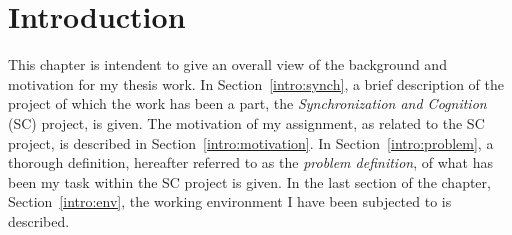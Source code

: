 
\cleardoublepage
\chapter{Introduction}
\label{intro}

This chapter is intendent to give an overall view of the background
and motivation for my thesis work.  In Section~\ref{intro:synch}, a
brief description of the project of which the work has been a part,
the {\em Synchronization and Cognition\/} (SC) project, is given.  The
motivation of my assignment, as related to the SC project, is
described in Section~\ref{intro:motivation}.  In
Section~\ref{intro:problem}, a thorough definition, hereafter referred
to as the {\em problem definition\/}, of what has been my task within
the SC project is given.  In the last section of the chapter,
Section~\ref{intro:env}, the working environment I have been
subjected to is described.





